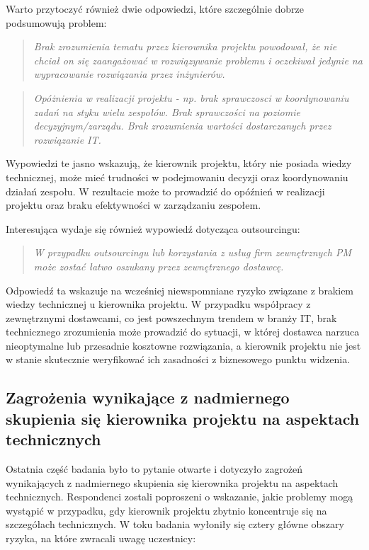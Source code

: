 Warto przytoczyć również dwie odpowiedzi, które szczególnie dobrze podsumowują problem:
\begin{quote}
  \textit{Brak zrozumienia tematu przez kierownika projektu powodował, że nie chciał on się zaangażować w rozwiązywanie problemu i oczekiwał jedynie na wypracowanie rozwiązania przez inżynierów.}
\end{quote}
\begin{quote}
  \textit{Opóżnienia w realizacji projektu - np. brak sprawczosci w koordynowaniu zadań na styku wielu zespołów. Brak sprawczości na poziomie decyzyjnym/zarządu. Brak zrozumienia wartości dostarczanych przez rozwiązanie IT.}
\end{quote}


Wypowiedzi te jasno wskazują, że kierownik projektu, który nie posiada wiedzy technicznej, może mieć trudności w podejmowaniu decyzji oraz koordynowaniu działań zespołu. W rezultacie może to prowadzić do opóźnień w realizacji projektu oraz braku efektywności w zarządzaniu zespołem. 

Interesująca wydaje się również wypowiedź dotycząca outsourcingu:
\begin{quote}
  \textit{W przypadku outsourcingu lub korzystania z usług firm zewnętrznych PM może zostać łatwo oszukany przez zewnętrznego dostawcę.}
\end{quote} 

Odpowiedź ta wskazuje na wcześniej niewspomniane ryzyko związane z brakiem wiedzy technicznej u kierownika projektu. W przypadku współpracy z zewnętrznymi dostawcami, co jest powszechnym trendem w branży IT, brak technicznego zrozumienia może prowadzić do sytuacji, w której dostawca narzuca nieoptymalne lub przesadnie kosztowne rozwiązania, a kierownik projektu nie jest w stanie skutecznie weryfikować ich zasadności z biznesowego punktu widzenia.

\subsection{Zagrożenia wynikające z nadmiernego skupienia się kierownika projektu na aspektach technicznych}
Ostatnia część badania było to pytanie otwarte i dotyczyło zagrożeń wynikających z nadmiernego skupienia się kierownika projektu na aspektach technicznych. Respondenci zostali poproszeni o wskazanie, jakie problemy mogą wystąpić w przypadku, gdy kierownik projektu zbytnio koncentruje się na szczegółach technicznych. W toku badania wyłoniły się cztery główne obszary ryzyka, na które zwracali uwagę uczestnicy:

